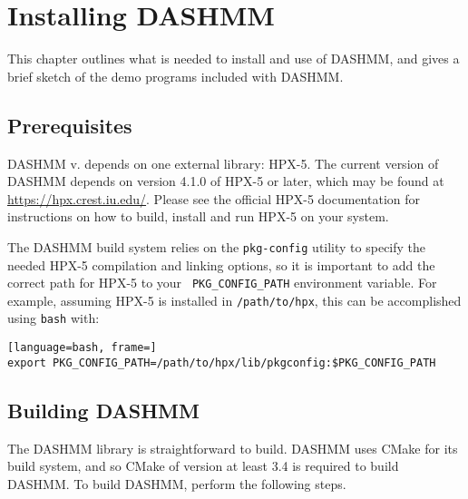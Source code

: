 \chapter{Installing DASHMM}
\label{ch:install}

This chapter outlines what is needed to install and use of DASHMM, and
gives a brief sketch of the demo programs included with DASHMM.

\section{Prerequisites}

DASHMM v. \version depends on one external library: HPX-5. The current
version of DASHMM depends on version 4.1.0 of HPX-5 or later, which
may be found at \url{https://hpx.crest.iu.edu/}. Please see the
official HPX-5 documentation for instructions on how to build, install
and run HPX-5 on your system.

The DASHMM build system relies on the {\tt pkg-config} utility to
specify the needed HPX-5 compilation and linking options, so it is
important to add the correct path for HPX-5 to your {\tt
  PKG\_CONFIG\_PATH} environment variable. For example, assuming HPX-5
is installed in {\tt /path/to/hpx}, this can be accomplished using
{\tt bash} with:

\begin{lstlisting}[language=bash, frame=]
export PKG_CONFIG_PATH=/path/to/hpx/lib/pkgconfig:$PKG_CONFIG_PATH
\end{lstlisting}

\section{Building DASHMM}

The DASHMM library is straightforward to build. DASHMM uses CMake for its
build system, and so CMake of version at least 3.4 is required to build
DASHMM. To build DASHMM, perform the following steps.

